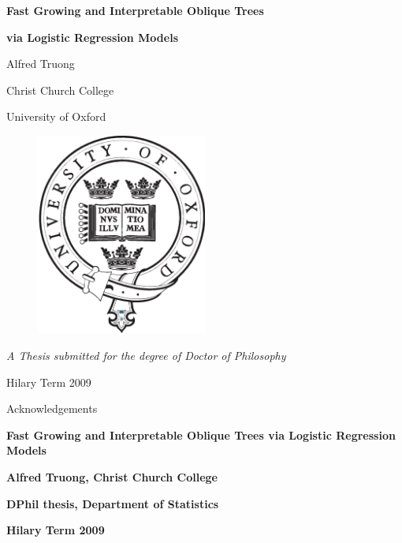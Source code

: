 \documentclass[12pt]{report}
\begin{document}
\begin{titlepage}

\LARGE \centerline{\bf Fast Growing and Interpretable Oblique Trees \rm }
\LARGE \centerline{\bf via Logistic Regression Models \rm }
\vspace{3em}
\large \centerline{Alfred Truong}
\vspace{0.5em}
\large \centerline{Christ Church College}
\vspace{0.5em}
\large \centerline{University of Oxford}
\vspace{2em}
\begin{figure} [h!]
\begin{center}
\includegraphics[width=0.5\textwidth]{Oxlogo_BW_lg.eps}
\end{center}
\end{figure}
\vspace{2em}
\large \centerline{\emph{A Thesis submitted for the degree of Doctor of Philosophy}}
\vspace{3em}
\large \centerline{Hilary Term 2009}

\end{titlepage}

\pagebreak
\thispagestyle{empty}

\vspace*{17cm}

Acknowledgements

\pagebreak
\thispagestyle{empty}

\begin{center}
\large \bf Fast Growing and Interpretable Oblique Trees via Logistic Regression Models
\end{center}
\vspace*{0.5cm}
\centerline{\bf Alfred Truong, Christ Church College}
\vspace*{0.5cm}
\centerline{\bf DPhil thesis, Department of Statistics}
\vspace*{0.5cm}
\centerline{\bf Hilary Term 2009}
\vspace*{0.5cm}
\end{document}
